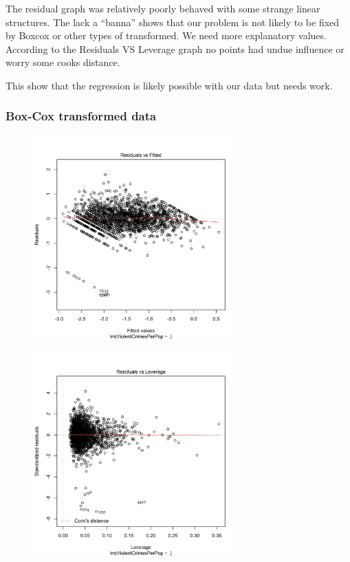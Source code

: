 \documentclass[12pt,a4paper]{article}
\begin{document}
\begin{singlespace}
The residual graph was relatively poorly behaved with some strange linear structures.
The lack a ``banna'' shows that our problem is not likely to be fixed by Boxcox or other types of transformed. We need more explanatory values.
According to the Residuals VS Leverage graph no points had undue influence
or worry some cooks distance.

This show that the regression is likely possible with our data but needs work.

\FloatBarrier

\newpage
\subsubsection{Box-Cox transformed data}
\vspace{-0.5cm}
\begin{figure}[h!]
    \centering
    \includegraphics[width=0.7\textwidth,trim= 0 0 20 30, clip]{Boxcox_regression_residuals.pdf}
\end{figure}
\FloatBarrier

\vspace{-0.5cm}
\begin{figure}[h!]
    \centering
    \includegraphics[width=0.7\textwidth,trim= 0 0 20 30, clip]{Boxcox_regression_cook.pdf}
\end{figure}
\FloatBarrier

\end{singlespace}
\end{document}
